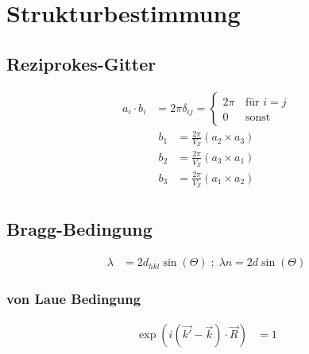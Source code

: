 \section{Strukturbestimmung}

\subsection*{Reziprokes-Gitter}
\begin{equation*}
    \begin{aligned}
        a_i \cdot b_i &= 2 \pi \delta_{ij} = \begin{cases}
            2 \pi & \, \text{für } i = j \\
            0 & \, \text{sonst}
            \end{cases}
    \end{aligned}
\end{equation*}
\begin{equation*}
    \begin{aligned}
        b_1 &= \frac{2 \pi}{V_Z} (a_2 \times a_3) \\
        b_2 &= \frac{2 \pi}{V_Z} (a_3 \times a_1) \\
        b_3 &= \frac{2 \pi}{V_Z} (a_1 \times a_2) \\
    \end{aligned}
\end{equation*}

\subsection*{Bragg-Bedingung}

\begin{equation*}
    \begin{aligned}
        \lambda &= 2d_{hkl} \sin(\Theta) \; ; \; \lambda n = 2d \sin(\Theta)
    \end{aligned}
\end{equation*}

\subsubsection*{von Laue Bedingung}
\begin{equation*}
    \begin{aligned}
        \exp \left(i \left(\vec{k'} -\vec{k}\right)\cdot \vec{R}\right) &= 1
    \end{aligned}
\end{equation*}

